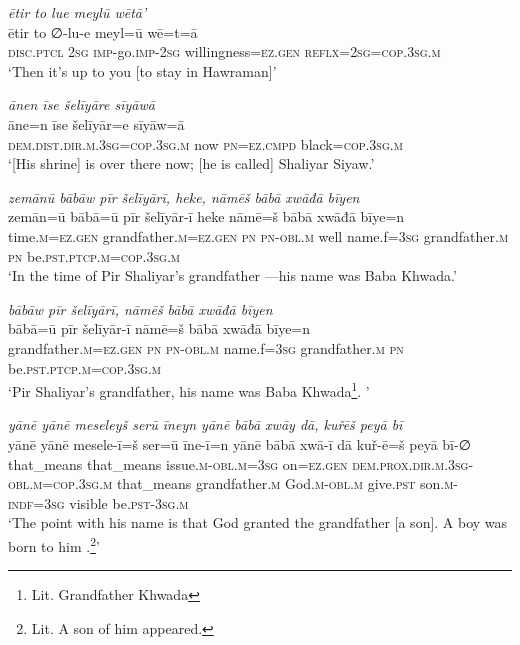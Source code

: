 \ea \label{ŽP.263}
\textit{ētir to lue meylū wētā’} \\ 
\gll ētir to ∅-lu-e meyl=ū wē=t=ā \\ 
 \textsc{disc.ptcl} \textsc{2sg} \textsc{imp-}go.\textsc{imp-}\textsc{2sg} willingness\textsc{\textsc{=ez.gen}} \textsc{reflx}\textsc{=\textsc{2sg}}\textsc{=cop}\textsc{.3sg}\textsc{.m} \\ 
\glt `Then it’s up to you [to stay in Hawraman]'
\z 
 
\ea \label{ŽP.267}
\textit{ānen īse šelīyāre sīyāwā} \\ 
\gll āne=n īse šelīyār=e sīyāw=ā \\ 
 \textsc{dem.dist}\textsc{.dir}\textsc{.m}\textsc{.3sg}\textsc{=cop}\textsc{.3sg}\textsc{.m} now \textsc{pn}\textsc{=ez}\textsc{.cmpd} black\textsc{=cop}\textsc{.3sg}\textsc{.m} \\ 
\glt `[His shrine] is over there now; [he is called] Shaliyar Siyaw.'
\z 
 
\ea \label{BP.1}
\textit{zemānū bābāw pīr šelīyārī, heke, nāmēš bābā xwāđā bīyen} \\ 
\gll zemān=ū bābā=ū pīr šelīyār-ī heke nāmē=š bābā xwāđā bīye=n \\ 
 time\textsc{.m}\textsc{=ez.gen} grandfather\textsc{.m}\textsc{=ez.gen} \textsc{pn} \textsc{pn}\textsc{-obl}\textsc{.m} well name.f\textsc{=3sg} grandfather\textsc{.m} \textsc{pn} be\textsc{.pst}\textsc{.ptcp}\textsc{.m}\textsc{=cop}\textsc{.3sg}\textsc{.m} \\ 
\glt `In the time of Pir Shaliyar’s grandfather —his name was Baba Khwada.'
\z 
 
\ea \label{BP.2}
\textit{bābāw pīr šelīyārī, nāmēš bābā xwāđā bīyen} \\ 
\gll bābā=ū pīr šelīyār-ī nāmē=š bābā xwāđā bīye=n \\ 
 grandfather\textsc{.m}\textsc{=ez.gen} \textsc{pn} \textsc{pn}\textsc{-obl}\textsc{.m} name.f\textsc{=3sg} grandfather\textsc{.m} \textsc{pn} be\textsc{.pst}\textsc{.ptcp}\textsc{.m}\textsc{=cop}\textsc{.3sg}\textsc{.m} \\ 
\glt `Pir Shaliyar’s grandfather, his name was Baba Khwada\footnote{Lit. Grandfather Khwada}. '
\z 
 
\ea \label{BP.3}
\textit{yānē yānē meseleyš serū īneyn yānē bābā xwāy dā, kuřēš peyā bī} \\ 
\gll yānē yānē mesele-ī=š ser=ū īne-ī=n yānē bābā xwā-ī dā kuř-ē=š peyā bī-∅ \\ 
 that\_means that\_means issue\textsc{.m}\textsc{-obl}\textsc{.m}\textsc{=3sg} on\textsc{=ez.gen} \textsc{dem.prox}\textsc{.dir}\textsc{.m}\textsc{.3sg}\textsc{-obl}\textsc{.m}\textsc{=cop}\textsc{.3sg}\textsc{.m} that\_means grandfather\textsc{.m} God\textsc{.m}\textsc{-obl}\textsc{.m} give\textsc{.pst} son\textsc{.m}\textsc{-indf}\textsc{=3sg} visible be\textsc{.pst}\textsc{-3sg}\textsc{.m} \\ 
\glt `The point with his name is that God granted the grandfather [a son]. A boy  was born to him .\footnote{Lit. A son of him appeared.}'
\z 
 
